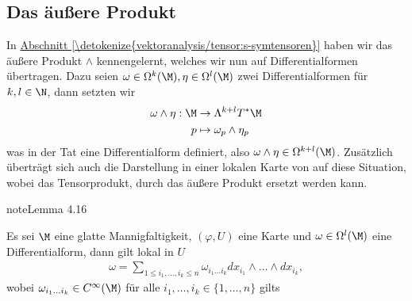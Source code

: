 \documentclass[letterpaper,10pt,german]{jupyterBook}
\begin{document}
\subsection{Das äußere Produkt}
\label{\detokenize{manifolds/diffformen:das-auszere-produkt}}
\sphinxAtStartPar
In \hyperref[\detokenize{vektoranalysis/tensor:s-symtensoren}]{Abschnitt \ref{\detokenize{vektoranalysis/tensor:s-symtensoren}}} haben wir das äußere Produkt \(\wedge\) kennengelernt, welches wir nun auf Differentialformen übertragen. Dazu seien \(\omega\in \Omega^k(\M), \eta\in \Omega^l(\M)\) zwei Differentialformen für \(k,l\in\N\), dann setzten wir
\begin{equation*}
\begin{split}\omega \wedge \eta:\M &\to \Lambda^{k+l}T^\ast\M\\
p&\mapsto \omega_p \wedge \eta_p\end{split}
\end{equation*}
\sphinxAtStartPar
was in der Tat eine Differentialform definiert, also \(\omega\wedge\eta \in \Omega^{k+l}(\M)\). Zusätzlich überträgt sich auch die Darstellung in einer lokalen Karte von {\hyperref[\detokenize{manifolds/tangential:cor:tensorfieldchart}]{}} auf diese Situation, wobei das Tensorprodukt, durch das äußere Produkt ersetzt werden kann.
\label{manifolds/diffformen:lemma-3}
\begin{sphinxadmonition}{note}{Lemma 4.16}



\sphinxAtStartPar
Es sei \(\M\) eine glatte Mannigfaltigkeit, \((\varphi,U)\) eine Karte und \(\omega\in\Omega^l(\M)\) eine Differentialform, dann gilt lokal in \(U\)
\begin{equation*}
\begin{split}\omega = \sum_{1\leq i_1,\ldots,i_k \leq n}\omega_{i_1\ldots i_k}
dx_{i_1}\wedge\ldots\wedge dx_{i_k},\end{split}
\end{equation*}
\sphinxAtStartPar
wobei \(\omega_{i_1\ldots i_k}\in C^\infty(\M)\) für alle \(i_1,\ldots,i_k\in\{1,\ldots,n\}\) gilts
\end{sphinxadmonition}
\end{document}
